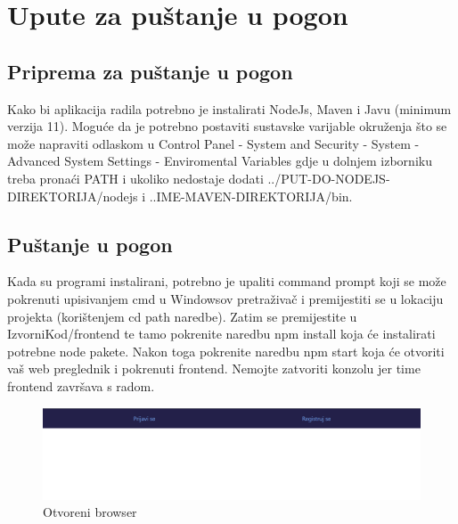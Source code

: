 			\eject 
		
		\section{Upute za puštanje u pogon}
		
			\subsection{Priprema za puštanje u pogon}
			
			Kako bi aplikacija radila potrebno je instalirati NodeJs, Maven i Javu (minimum verzija 11). Moguće da je potrebno postaviti sustavske varijable okruženja što se može napraviti odlaskom u Control Panel - System and Security - System - Advanced System Settings - Enviromental Variables gdje u dolnjem izborniku treba pronaći PATH i ukoliko nedostaje dodati ../PUT-DO-NODEJS-DIREKTORIJA/nodejs i ..IME-MAVEN-DIREKTORIJA/bin.
			
			\subsection{Puštanje u pogon}
			
			Kada su programi instalirani, potrebno je upaliti command prompt koji se može pokrenuti upisivanjem cmd u Windowsov pretraživač i premijestiti se u lokaciju projekta (korištenjem cd path naredbe). Zatim se premijestite u IzvorniKod/frontend te tamo pokrenite naredbu npm install koja će instalirati potrebne node pakete. Nakon toga pokrenite naredbu npm start koja će otvoriti vaš web preglednik i pokrenuti frontend. Nemojte zatvoriti konzolu jer time frontend završava s radom.
			

		
				\begin{figure}[H]
					\includegraphics[scale=0.3]{slike/browser.png}
					\centering
					\caption{Otvoreni browser}
					\label{fig:test4}
				\end{figure}
		
